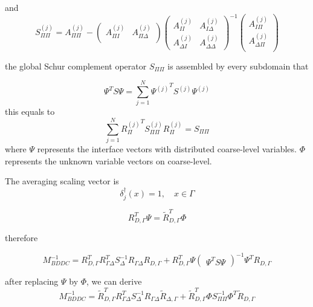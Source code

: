  and 
 \begin{equation}
 S_{\Pi \Pi}^{(j)} = A_{\Pi \Pi}^{(j)} - \begin{pmatrix}
 A_{\Pi I}^{(j)} & A_{\Pi \Delta}^{(j)} \\
 \end{pmatrix} \begin{pmatrix}
 A_{II}^{(j)} & A_{I \Delta}^{(j)} \\
 A_{\Delta I}^{(j)} & A_{\Delta \Delta}^{(j)}
 \end{pmatrix}^{-1} \begin{pmatrix}
 A_{I \Pi}^{(j)} \\ A_{\Delta \Pi}^{(j)}\\
 \end{pmatrix}
 \end{equation}
 
 the global Schur complement operator $ S_{\Pi \Pi} $ is assembled by every subdomain that
 
 \begin{equation}
 \Psi^{T} S \Psi = \sum_{j = 1}^{N} {\Psi^{(j)}}^{T} S^{(j)} \Psi^{(j)} 
 \end{equation}
 this equals to 
 \begin{equation}
 \sum_{j = 1}^{N} {R_{\Pi}^{(j)}}^{T} S_{\Pi \Pi}^{(j)} R_{\Pi}^{(j)} = S_{\Pi\Pi}
 \end{equation}
 where $ \Psi $ represents the interface vectors with distributed coarse-level variables. $ \Phi $ represents the unknown variable vectors on coarse-level.
 
 The averaging scaling vector is
 \begin{equation}
 \delta^{\dagger}_{j} (x) = 1, \quad x \in \Gamma
 \end{equation}
 
\begin{equation}
R_{D, \Gamma}^{T} \Psi = \tilde{R}_{D, \Gamma}^{T} \Phi
\end{equation}

therefore

\begin{equation}
M_{BDDC}^{-1} = R_{D, \Gamma}^{T} R_{\Gamma \Delta}^{T} S_{\Delta}^{-1} R_{\Gamma \Delta} R_{D, \Gamma} + R_{D, \Gamma}^{T} \Psi 
\begin{pmatrix}
\Psi^{T} S \Psi
\end{pmatrix}^{-1} \Psi^{T} R_{D, \Gamma}
\end{equation}

after replacing $ \Psi $ by $ \Phi $, we can derive
\begin{equation}
M_{BDDC}^{-1} = \tilde{R}_{D, \Gamma}^{T} R_{\Gamma \Delta}^{T} S_{\Delta}^{-1} R_{\Gamma \Delta} \tilde{R}_{\Delta, \Gamma} + \tilde{R}_{D, \Gamma}^{T} \Phi S_{\Pi \Pi}^{-1} \Phi^{T} \tilde{R}_{D, \Gamma}
\end{equation}


